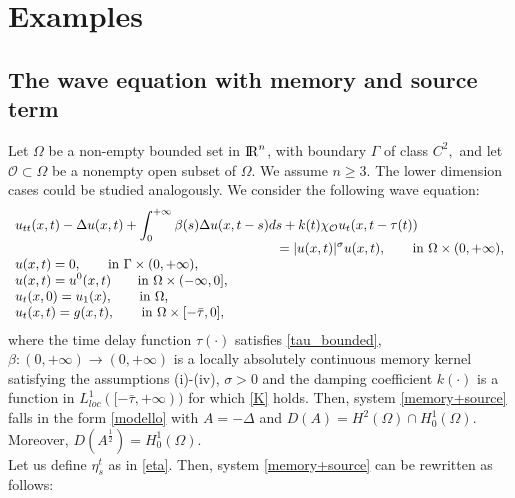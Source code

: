 \documentclass[11pt]{article}
\newcommand{\RR}{{{\rm I} \kern -.15em {\rm R} }}
\renewcommand{\ge}{\geqslant}
\begin{document}
\section{Examples}

\setcounter{equation}{0}

\subsection{The wave equation with memory and source term}\label{ex1}
Let $\Omega$ be a non-empty bounded set in $\RR^n$, with boundary $\Gamma$ of class $C^2,$ and  let $\mathcal{O}\subset \Omega$ be a nonempty open subset of $\Omega$. We assume $n\ge 3.$ The lower dimension cases could be studied analogously. We consider the following wave equation:
\begin{equation}
\label{memory+source}
\begin{array}{l}
\displaystyle{u_{tt}(x,t)-\Delta u(x,t)+\int_0^{+\infty} \beta(s)\Delta u(x,t-s) ds+k(t)\chi _{\mathcal{O}} u_t(x,t-\tau(t))}\\
\hspace{7 cm}
\displaystyle{=|u(x,t)|^\sigma u(x,t), \qquad \text{in} \ \Omega \times (0,+\infty),}\\
\displaystyle{ u(x,t)=0, \qquad \text{in} \ \Gamma \times (0,+\infty),}\\
\displaystyle{ u(x,t)=u^0(x,t) \qquad \text{in} \ \Omega \times (-\infty,0],}\\
\displaystyle{ u_t(x,0)=u_1(x), \qquad \text{in} \ \Omega,} \\
\displaystyle{ u_t(x,t)=g(x,t), \qquad \text{in} \ \Omega \times [-\bar\tau,0],}
\end{array}
\end{equation}
where the time delay function $\tau (\cdot)$ satisfies \eqref{tau_bounded}, $\beta :(0,+\infty)\rightarrow (0,+\infty)$ is a locally absolutely continuous memory kernel satisfying the assumptions (i)-(iv), $\sigma >0$ and the damping coefficient $k(\cdot)$ is a function in $L^1_{loc}([-\bar{\tau},+\infty))$ for which \eqref{K} holds.
Then, system \eqref{memory+source} falls in the form \eqref{modello} with $A=-\Delta$ and $D(A)=H^2(\Omega)\cap H^1_0(\Omega).$ Moreover, $D(A^{\frac{1}{2}})=H^1_0(\Omega).$ 
\\Let us define $\eta_s^t$ as in \eqref{eta}. Then, system \eqref{memory+source} can be rewritten as follows:
\end{document}
